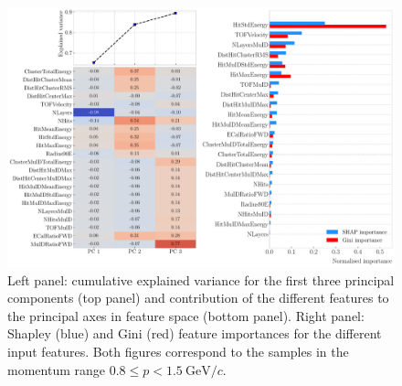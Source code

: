 \begin{figure}[t]
	\centering
	\includegraphics[width=.95\linewidth]{Images/GArSoft_PID/BDT/summary_pca_p0_1.15_sigmap_0.35.pdf}
	\caption[Results of the PCA, Shapley and Gini feature importance analyses for the momentum range $0.8 \leq p < 1.5 ~ \mathrm{GeV}/c$.]{Left panel: cumulative explained variance for the first three principal components (top panel) and contribution of the different features to the principal axes in feature space (bottom panel). Right panel: Shapley (blue) and Gini (red) feature importances for the different input features. Both figures correspond to the samples in the momentum range $0.8 \leq p < 1.5 ~ \mathrm{GeV}/c$.}
	\label{fig:bdt_pca_importance_iii}
\end{figure}

